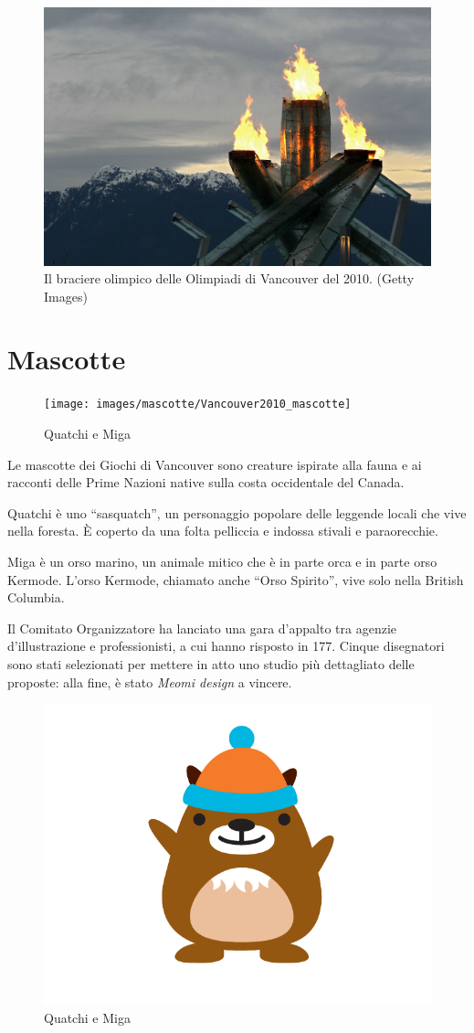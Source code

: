 \documentclass[
]{book}
\begin{document}
\begin{figure}
\includegraphics[width=0.8\linewidth]{images/IlPost/2010(2)} \caption{Il braciere olimpico delle Olimpiadi di Vancouver del 2010. (Getty Images)}\label{fig:unnamed-chunk-81}
\end{figure}

\section*{Mascotte}\label{mascotte-10}

\begin{figure}
\texttt{[image: images/mascotte/Vancouver2010\_mascotte]} \caption{Quatchi e Miga}\label{fig:unnamed-chunk-82}
\end{figure}

Le mascotte dei Giochi di Vancouver sono creature ispirate alla fauna e ai racconti delle Prime Nazioni native sulla costa occidentale del Canada.

Quatchi è uno ``sasquatch'', un personaggio popolare delle leggende locali che vive nella foresta. È coperto da una folta pelliccia e indossa stivali e paraorecchie.

Miga è un orso marino, un animale mitico che è in parte orca e in parte orso Kermode. L'orso Kermode, chiamato anche ``Orso Spirito'', vive solo nella British Columbia.

Il Comitato Organizzatore ha lanciato una gara d'appalto tra agenzie d'illustrazione e professionisti, a cui hanno risposto in 177. Cinque disegnatori sono stati selezionati per mettere in atto uno studio più dettagliato delle proposte: alla fine, è stato \emph{Meomi design} a vincere.

\begin{figure}
\includegraphics[width=0.4\linewidth]{images/mascotte/mukmuk} \caption{Quatchi e Miga}\label{fig:unnamed-chunk-83}
\end{figure}
\end{document}
